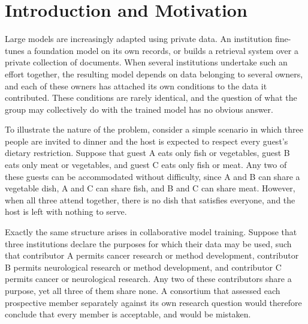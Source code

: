 \documentclass[sigconf,anonymous,review]{acmart}
\begin{document}


\maketitle

\section{Introduction and Motivation}
\label{sec:intro}

Large models are increasingly adapted using private data. An institution
fine-tunes a foundation model on its own records, or builds a retrieval system
over a private collection of documents. When several institutions undertake such
an effort together, the resulting model depends on data belonging to several
owners, and each of these owners has attached its own conditions to the data it
contributed. These conditions are rarely identical, and the question of what the
group may collectively do with the trained model has no obvious answer.

To illustrate the nature of the problem, consider a simple scenario in which
three people are invited to dinner and the host is expected to respect every
guest's dietary restriction. Suppose that guest A eats only fish or vegetables,
guest B eats only meat or vegetables, and guest C eats only fish or meat. Any two
of these guests can be accommodated without difficulty, since A and B can share a
vegetable dish, A and C can share fish, and B and C can share meat. However, when
all three attend together, there is no dish that satisfies everyone, and the host
is left with nothing to serve.

Exactly the same structure arises in collaborative model training. Suppose that
three institutions declare the purposes for which their data may be used, such
that contributor A permits cancer research or method development, contributor B
permits neurological research or method development, and contributor C permits
cancer or neurological research. Any two of these contributors share a purpose,
yet all three of them share none. A consortium that assessed each prospective
member separately against its own research question would therefore conclude that
every member is acceptable, and would be mistaken.
\end{document}
